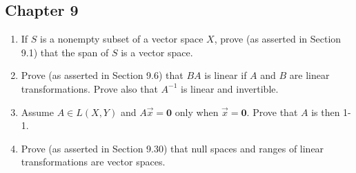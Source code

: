 \documentclass[../psets.tex]{subfiles}
\begin{document}
\subsection*{Chapter 9}
\begin{enumerate}[label={\textbf{\arabic*.}}]
    \item If $S$ is a nonempty subset of a vector space $X$, prove (as asserted in Section 9.1) that the span of $S$ is a vector space.
    \item Prove (as asserted in Section 9.6) that $BA$ is linear if $A$ and $B$ are linear transformations. Prove also that $A^{-1}$ is linear and invertible.
    \item Assume $A\in L(X,Y)$ and $A\vec{x}=\bm{0}$ only when $\vec{x}=\bm{0}$. Prove that $A$ is then 1-1.
    \item Prove (as asserted in Section 9.30) that null spaces and ranges of linear transformations are vector spaces.
\end{enumerate}
\end{document}
